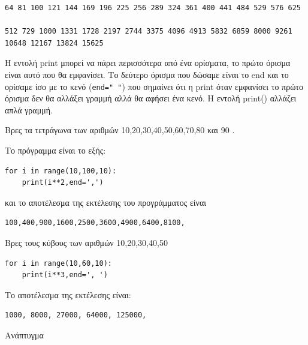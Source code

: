 \begin{lstlisting}
64 81 100 121 144 169 196 225 256 289 324 361 400 441 484 529 576 625 

512 729 1000 1331 1728 2197 2744 3375 4096 4913 5832 6859 8000 9261 
10648 12167 13824 15625
\end{lstlisting}

Η εντολή print μπορεί να πάρει περισσότερα από ένα ορίσματα, το πρώτο όρισμα είναι αυτό που θα εμφανίσει. Το δεύτερο όρισμα που δώσαμε είναι το end και το ορίσαμε ίσο με το κενό (\lstinline{end=" "}) που σημαίνει ότι η print όταν εμφανίσει το πρώτο όρισμα δεν θα αλλάξει γραμμή αλλά θα αφήσει ένα κενό. Η εντολή print() αλλάζει απλά γραμμή.
\begin{exercise}
Βρες τα τετράγωνα των αριθμών 10,20,30,40,50,60,70,80 και 90 .
\end{exercise}
Το πρόγραμμα είναι το εξής:
\begin{lstlisting}
for i in range(10,100,10):
    print(i**2,end=',')
\end{lstlisting}
και το αποτέλεσμα της εκτέλεσης του προγράμματος είναι
\begin{lstlisting}
100,400,900,1600,2500,3600,4900,6400,8100,
\end{lstlisting}

\begin{exercise}
Βρες τους κύβους των αριθμών 10,20,30,40,50
\end{exercise}

\begin{lstlisting}
for i in range(10,60,10):
    print(i**3,end=', ')  
\end{lstlisting}
Το αποτέλεσμα της εκτέλεσης είναι:
\begin{lstlisting}
1000, 8000, 27000, 64000, 125000, 
\end{lstlisting}

Ανάπτυγμα
